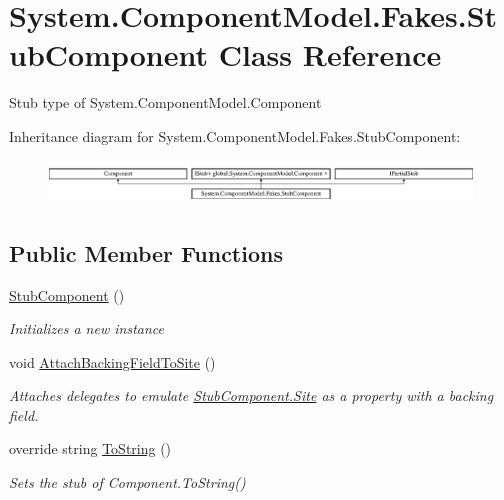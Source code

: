 \hypertarget{class_system_1_1_component_model_1_1_fakes_1_1_stub_component}{\section{System.\-Component\-Model.\-Fakes.\-Stub\-Component Class Reference}
\label{class_system_1_1_component_model_1_1_fakes_1_1_stub_component}
}


Stub type of System.\-Component\-Model.\-Component 


Inheritance diagram for System.\-Component\-Model.\-Fakes.\-Stub\-Component\-:\begin{figure}[H]
\begin{center}
\leavevmode
\includegraphics[height=1.170324cm]{class_system_1_1_component_model_1_1_fakes_1_1_stub_component}
\end{center}
\end{figure}
\subsection*{Public Member Functions}
\begin{DoxyCompactItemize}
\item 
\hyperlink{class_system_1_1_component_model_1_1_fakes_1_1_stub_component_ad3c48233c59176a93b78ad8efc21968e}{Stub\-Component} ()
\begin{DoxyCompactList}\small\item\em Initializes a new instance\end{DoxyCompactList}\item 
void \hyperlink{class_system_1_1_component_model_1_1_fakes_1_1_stub_component_a0ec01f2a0c41071cc030c475b59bab5e}{Attach\-Backing\-Field\-To\-Site} ()
\begin{DoxyCompactList}\small\item\em Attaches delegates to emulate \hyperlink{class_system_1_1_component_model_1_1_fakes_1_1_stub_component_a9ca954dd0f109278a0d86edc73e698de}{Stub\-Component.\-Site} as a property with a backing field.\end{DoxyCompactList}\item 
override string \hyperlink{class_system_1_1_component_model_1_1_fakes_1_1_stub_component_a2d420334d108b82075361ffce6b67d57}{To\-String} ()
\begin{DoxyCompactList}\small\item\em Sets the stub of Component.\-To\-String()\end{DoxyCompactList}\end{DoxyCompactItemize}
